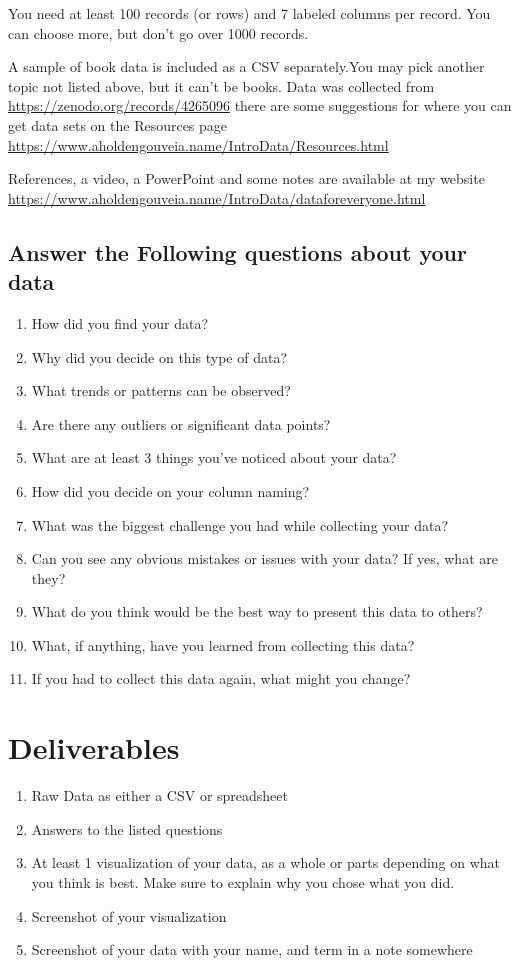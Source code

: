 \documentclass[12pt]{article}
\begin{document}
You need at least 100 records (or rows) and 7 labeled columns per record. You can choose more, but don't go over 1000 records.

A sample of book data is included as a CSV separately.You may pick another topic not listed above, but it can't be books. Data was collected from \url {https://zenodo.org/records/4265096} there are some suggestions for where you can get data sets on the Resources page \url{https://www.aholdengouveia.name/IntroData/Resources.html}



References, a video, a PowerPoint and some notes are available at my website \url {https://www.aholdengouveia.name/IntroData/dataforeveryone.html}

\subsection*{Answer the Following questions about your data}
    \begin{enumerate}
        \item How did you find your data?
        \item Why did you decide on this type of data?
        \item What trends or patterns can be observed?
        \item Are there any outliers or significant data points?
        \item What are at least 3 things you've noticed about your data? 
        \item How did you decide on your column naming?
        \item What was the biggest challenge you had while collecting your data?
        \item Can you see any obvious mistakes or issues with your data? If yes, what are they?
        \item What do you think would be the best way to present this data to others? 
        \item What, if anything, have you learned from collecting this data?
        \item If you had to collect this data again, what might you change?
    \end{enumerate}



\section*{Deliverables}
\begin{enumerate}
    \item Raw Data as either a CSV or spreadsheet
    \item Answers to the listed questions
    \item At least 1 visualization of your data, as a whole or parts depending on what you think is best.  Make sure to explain why you chose what you did. 
    \item Screenshot of your visualization
    \item Screenshot of your data with your name, and term in a note somewhere
\end{enumerate}
\end{document}
